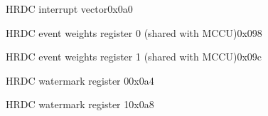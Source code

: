 \begin{register}{H}{RDC interrupt vector}{0x0a0}
	\label{RDC_intrv}
	\regnewline
\end{register}
\begin{register}{H}{RDC event weights register 0 (shared with MCCU)}{0x098}
	\label{RDC_weight0}
	\regnewline
\end{register}
\begin{register}{H}{RDC event weights register 1 (shared with MCCU)}{0x09c}
	\label{RDC_weight1}
	\regnewline
\end{register}


\begin{register}{H}{RDC watermark register 0}{0x0a4}
	\label{RDC_water0}
	\regnewline
\end{register}


\begin{register}{H}{RDC watermark register 1}{0x0a8}
	\label{RDC_water1}
	\regnewline
\end{register}


